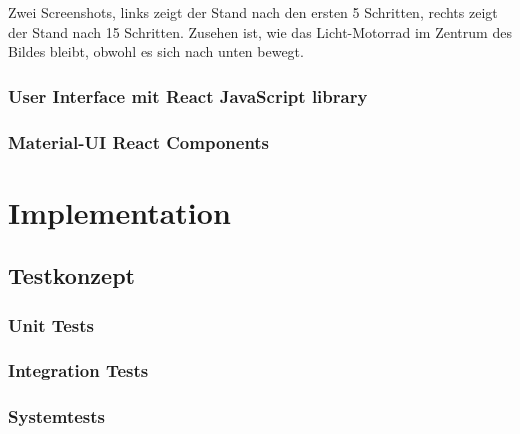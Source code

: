\documentclass[11pt,ngerman]{article}
\begin{document}
	Zwei Screenshots, links zeigt der Stand nach den ersten 5 Schritten, rechts zeigt der Stand nach 15 Schritten. Zusehen ist, wie das Licht-Motorrad im Zentrum des Bildes bleibt, obwohl es sich nach unten bewegt.

    \subsubsection{User Interface mit React JavaScript library}

    \subsubsection{Material-UI React Components}




    \section{Implementation}

    \subsection{Testkonzept}

    \subsubsection{Unit Tests}

    \subsubsection{Integration Tests}

    \subsubsection{Systemtests}
\end{document}
